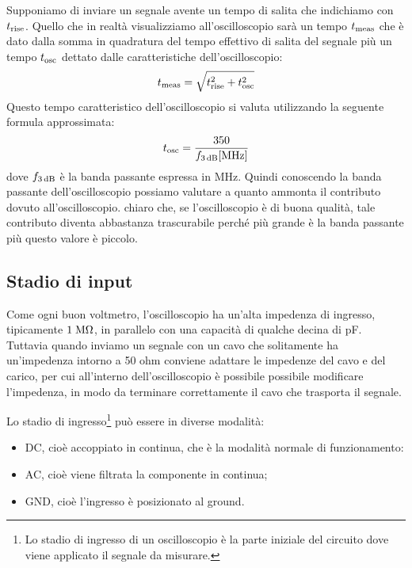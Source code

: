 Supponiamo di inviare un segnale avente un tempo di salita che indichiamo con $t_{\rm rise}$. Quello che in realtà visualizziamo all'oscilloscopio sarà un tempo $t_{\rm meas}$ che è dato dalla somma in quadratura del tempo effettivo di salita del segnale più un tempo $t_{\rm osc}$ dettato dalle caratteristiche dell'oscilloscopio:
\begin{equation*}
   t_{\rm meas}=\sqrt{ t_{\rm rise}^2 + t_{\rm osc}^2 }
\end{equation*}
Questo tempo caratteristico dell'oscilloscopio si valuta utilizzando la seguente formula approssimata:
\begin{equation*}
   t_{\rm osc}=\frac{350}{f_{\rm 3 \, dB}[\rm MHz]}
\end{equation*}
dove $f_{\rm 3 \, dB}$ è la banda passante espressa in MHz. Quindi conoscendo la banda passante dell'oscilloscopio possiamo valutare a quanto ammonta il contributo dovuto all'oscilloscopio. \E chiaro che, se l'oscilloscopio è di buona qualità, tale contributo diventa abbastanza trascurabile perché più grande è la banda passante più questo valore è piccolo.

\subsection{Stadio di input}

Come ogni buon voltmetro, l'oscilloscopio ha un'alta impedenza di ingresso, tipicamente $1 \rm \; M\Omega$, in parallelo con una capacità di qualche decina di pF. Tuttavia quando inviamo un segnale con un cavo che solitamente ha un'impedenza intorno a 50 ohm conviene adattare le impedenze del cavo e del carico, per cui all'interno dell'oscilloscopio è possibile possibile modificare l'impedenza, in modo da terminare correttamente il cavo che trasporta il segnale.

Lo stadio di ingresso\footnote{Lo stadio di ingresso di un oscilloscopio è la parte iniziale del circuito dove viene applicato il segnale da misurare.} può essere in diverse modalità: 
\begin{itemize}[leftmargin=0.5cm]
   \item DC, cioè accoppiato in continua, che è la modalità normale di funzionamento:
   \item AC, cioè viene filtrata la componente in continua;
   \item GND, cioè l'ingresso è posizionato al ground.
\end{itemize}

